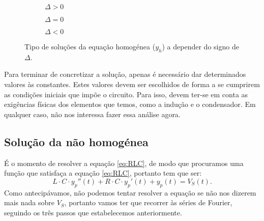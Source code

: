 \begin{figure}
\begin{figurebox}
    \vspace{10pt}
    \centering
      \begin{subfigure}{.3\textwidth}
          \centering
          \scalebox{0.25}{ }
          \caption{$\Delta>0$}
          \label{fig:a} 
      \end{subfigure} %
      \begin{subfigure}{.3\textwidth}
          \centering
          \scalebox{0.25}{}
          \caption{$\Delta=0$}
          \label{fig:b}
      \end{subfigure} %
      \begin{subfigure}{.3\textwidth}
          \centering
          \scalebox{0.25}{}
          \caption{$\Delta<0$}
          \label{fig:c}
      \end{subfigure}
      \caption{Tipo de soluções da equação homogénea ($y_h$) a depender do signo de $\Delta$.}
      \label{fig:SolucionesHomogenea}
    
\end{figurebox}
\end{figure}

Para terminar de concretizar a solução, apenas é necessário dar determinados valores às constantes. Estes valores devem ser escolhidos de forma a se cumprirem as condições iniciais que impõe o circuito. Para isso, devem ter-se em conta as exigências físicas dos elementos que temos, como a indução e o condensador. Em qualquer caso, não nos interessa fazer essa análise agora.


\subsection{Solução da não homogénea} 
É o momento de resolver a equação \eqref{eq:RLC}, de modo que
procuramos uma função que satisfaça a equação \eqref{eq:RLC},
portanto tem que ser:
\[
L\cdot C \cdot y_p '' (t) + R\cdot C\cdot y_p'(t) + y_p(t) = V_S(t).
\]
Como antecipávamos, não podemos tentar resolver a equação se não nos dizerem mais nada sobre $V_S$, portanto vamos ter que recorrer às séries de Fourier, seguindo os três passos que estabelecemos anteriormente.

